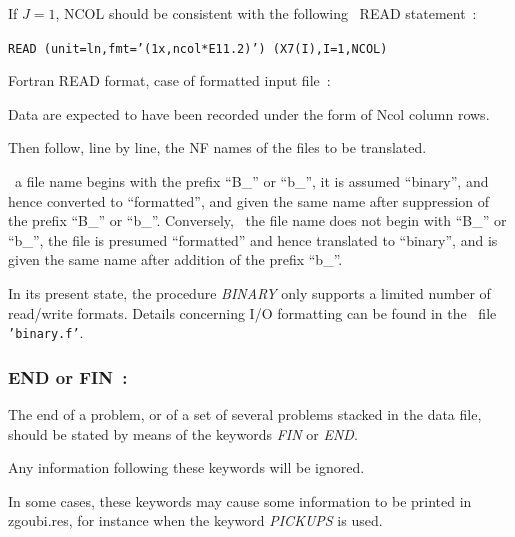 \medskip

 If $J=1$, NCOL should be consistent with the following \FORTRAN\ READ statement~: 

       {\tt     READ (unit=ln,fmt='(1x,ncol*E11.2)') (X7(I),I=1,NCOL)}

\medskip

\noindent Fortran READ format, case of formatted input file~: 

\smallskip

 Data are expected to have been recorded under the form of Ncol column rows. 
 
\bigskip

\noindent Then follow, line by line, the NF names of the files to be translated.

\medskip

\noindent \If\ a file name begins with the prefix ``B\_'' or ``b\_'', it is 
assumed ``binary'', and hence converted to ``formatted'', and given 
the same name after suppression of the prefix ``B\_'' or ``b\_''. Conversely, 
\Iff\ the file name does not begin with ``B\_'' or ``b\_'', the file is 
presumed ``formatted'' and hence translated to ``binary'', and is 
given the same name after addition of the prefix ``b\_''.

\medskip

\noindent In its present state, the procedure \textsl{BINARY} 
only supports a limited number of read/write formats. Details concerning I/O formatting can be found 
in the \FORTRAN\ file \texttt{'binary.f'}.





\newpage

\subsubsection*{END or FIN~: \ENDTitl}  \label{FIN}  \label{END} 
\medskip

The end of a problem, or of a set of several problems stacked in 
the data file, should be stated by means of the keywords \textsl{FIN} or
\textsl{END}.  

\bigskip

\noindent Any information following these keywords will be ignored. 

\bigskip

\noindent In some cases, these keywords may cause some information to be  printed in zgoubi.res, for instance when the 
keyword \textsl{PICKUPS} is used. 




